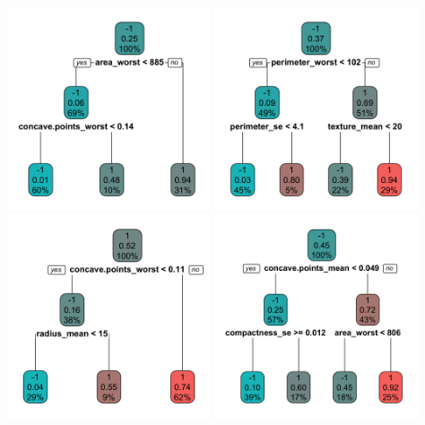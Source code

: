 \begin{center}
\includegraphics[width=0.45\textwidth]{img/wisconsin-boosting-tree-1.png}
\includegraphics[width=0.45\textwidth]{img/wisconsin-boosting-tree-3.png}
\includegraphics[width=0.45\textwidth]{img/wisconsin-boosting-tree-6.png}
\includegraphics[width=0.45\textwidth]{img/wisconsin-boosting-tree-8.png}
\end{center}

